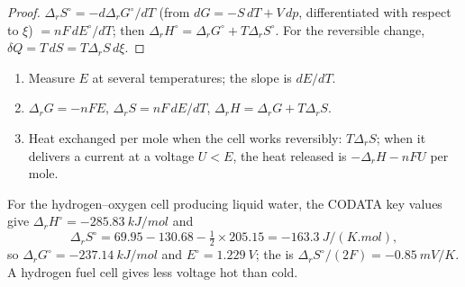 \begin{proof}
$\Delta_r S^\circ = -d\Delta_r G^\circ/dT$ (from $dG = -S\,dT + V\,dp$, differentiated
with respect to $\xi$) $= nF\,dE^\circ/dT$; then $\Delta_r H^\circ = \Delta_r G^\circ
+ T\Delta_r S^\circ$. For the reversible change, $\delta Q = T\,dS = T\Delta_r S\,
d\xi$.
\end{proof}

\begin{method}\label{met:b2:cell-thermodynamics:cell-data}
\begin{enumerate}
  \item Measure $E$ at several temperatures; the slope is $dE/dT$.
  \item $\Delta_r G = -nFE$, $\Delta_r S = nF\,dE/dT$, $\Delta_r H = \Delta_r G +
        T\Delta_r S$.
  \item Heat exchanged per mole when the cell works reversibly: $T\Delta_r S$;
        when it delivers a current at a voltage $U < E$, the heat released is
        $-\Delta_r H - nFU$ per mole.
\end{enumerate}
\end{method}

For the hydrogen--oxygen cell producing liquid water, the CODATA key values
give $\Delta_r H^\circ = \qty{-285.83}{kJ/mol}$ and
\[
  \Delta_r S^\circ = 69.95 - 130.68 - \tfrac12 \times 205.15 = \qty{-163.3}{J/(K.mol)} ,
\]
so $\Delta_r G^\circ = \qty{-237.14}{kJ/mol}$ and $E^\circ = \qty{1.229}{V}$; the
 is $\Delta_r S^\circ/(2F) = \qty{-0.85}{mV/K}$. A hydrogen fuel cell gives less
voltage hot than cold.

